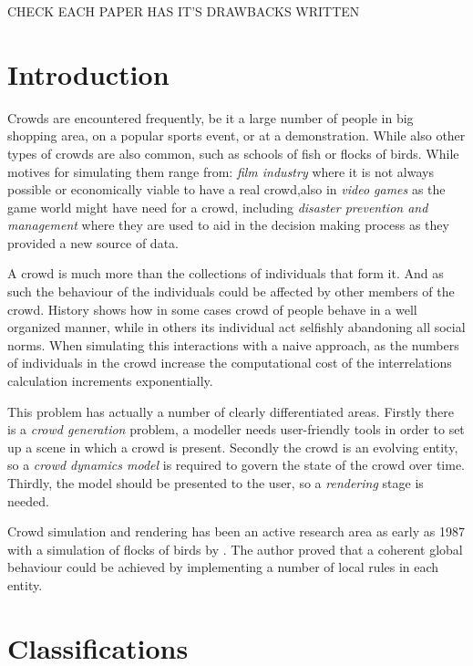 \documentclass[6pt]{article}
\begin{document}
\columnsep 25.0pt %
\begin{multicols}{2}
CHECK EACH PAPER HAS IT'S DRAWBACKS WRITTEN
\section{Introduction}
\label{intro}

Crowds are encountered frequently, be it a large number of people in big shopping area, on a popular sports event, or at a demonstration.
While also other types of crowds are also common, such as schools of fish or flocks of birds.
While motives for simulating them range from: \textit{film industry} where it is not always possible or economically viable to have a real crowd,also in \textit{video games} as the game world might have need for a crowd, including \textit{disaster prevention and management} where they are used to aid in the decision making process as they provided a new source of data.

A crowd is much more than the collections of individuals that form it.
And as such the behaviour of the individuals could be affected by other members of the crowd.
History shows how in some cases crowd of people behave in a well organized manner, while in others its individual act selfishly abandoning all social norms.
When simulating this interactions with a naive approach, as the numbers of individuals in the crowd increase the computational cost of the interrelations calculation increments exponentially.

This problem has actually a number of clearly differentiated areas.
Firstly there is a \textit{crowd generation} problem, a modeller needs user-friendly tools in order to set up a scene in which a crowd is present.
Secondly the crowd is an evolving entity, so a \textit{crowd dynamics model} is required to govern the state of the crowd over time.
Thirdly, the model should be presented to the user, so a \textit{rendering} stage is needed.

Crowd simulation and rendering has been an active research area as early as 1987 with a simulation of flocks of birds by \cite{Reynolds1987}.
The author proved that a coherent global behaviour could be achieved by implementing a number of local rules in each entity.

\section{Classifications}


\end{multicols}
\end{document}
